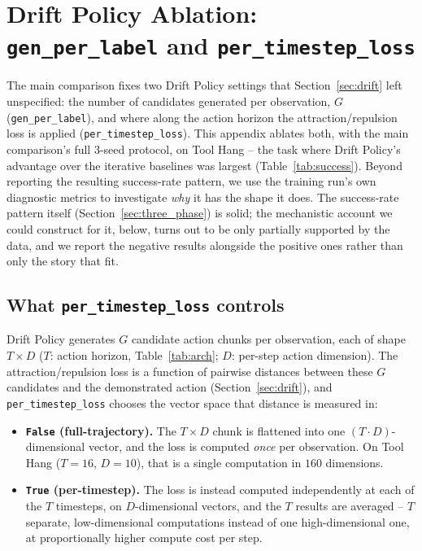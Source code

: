 \documentclass[11pt]{article}
\begin{document}
\appendix

\section{Drift Policy Ablation: \texttt{gen\_per\_label} and \texttt{per\_timestep\_loss}}
\label{sec:appendix_ablation}

The main comparison fixes two Drift Policy settings that Section~\ref{sec:drift}
left unspecified: the number of candidates generated per observation, $G$
(\texttt{gen\_per\_label}), and where along the action horizon the
attraction/repulsion loss is applied (\texttt{per\_timestep\_loss}). This
appendix ablates both, with the main comparison's full 3-seed protocol, on
Tool Hang -- the task where Drift Policy's advantage over the iterative
baselines was largest (Table~\ref{tab:success}). Beyond reporting the
resulting success-rate pattern, we use the training run's own diagnostic
metrics to investigate \emph{why} it has the shape it does. The
success-rate pattern itself (Section~\ref{sec:three_phase}) is solid; the
mechanistic account we could construct for it, below, turns out to be
only partially supported by the data, and we report the negative results
alongside the positive ones rather than only the story that fit.

\subsection{What \texttt{per\_timestep\_loss} controls}
\label{sec:what_ptl_controls}

Drift Policy generates $G$ candidate action chunks per observation, each of
shape $T\times D$ ($T$: action horizon, Table~\ref{tab:arch}; $D$: per-step
action dimension). The attraction/repulsion loss is a function of pairwise
distances between these $G$ candidates and the demonstrated action
(Section~\ref{sec:drift}), and \texttt{per\_timestep\_loss} chooses the
vector space that distance is measured in:

\begin{itemize}
\item \textbf{\texttt{False} (full-trajectory).} The $T\times D$ chunk is
flattened into one $(T{\cdot}D)$-dimensional vector, and the loss is
computed \emph{once} per observation. On Tool Hang ($T=16$, $D=10$), that
is a single computation in $160$ dimensions.
\item \textbf{\texttt{True} (per-timestep).} The loss is instead computed
independently at each of the $T$ timesteps, on $D$-dimensional vectors, and
the $T$ results are averaged -- $T$ separate, low-dimensional computations
instead of one high-dimensional one, at proportionally higher compute cost
per step.
\end{itemize}
\end{document}
